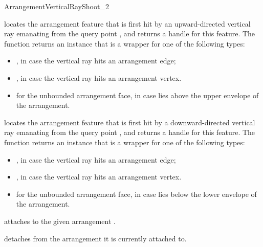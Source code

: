 \begin{ccRefConcept}{ArrangementVerticalRayShoot_2}
  {locates the arrangement feature that is first hit by an upward-directed
   vertical ray emanating from the query point ,
   and returns a handle for this feature.
   The function returns an  instance that is a wrapper for
   one of the following types:
   \begin{itemize}
   \item {}, in case the vertical
         ray hits an arrangement edge;
   \item {}, in case the vertical
         ray hits an arrangement vertex.
   \item {} for the unbounded arrangement
         face, in case  lies above the upper envelope of the
         arrangement.
   \end{itemize}
   }

  {locates the arrangement feature that is first hit by a downward-directed
   vertical ray emanating from the query point ,
   and returns a handle for this feature.
   The function returns an  instance that is a wrapper for
   one of the following types:
   \begin{itemize}
   \item {}, in case the vertical
         ray hits an arrangement edge;
   \item {}, in case the vertical
         ray hits an arrangement vertex.
   \item {} for the unbounded arrangement
         face, in case  lies below the lower envelope of the
         arrangement.
   \end{itemize}
   }

\ccOperations

  {attaches \ccVar{} to the given arrangement .}

  {detaches \ccVar{} from the arrangement it is currently attached to.}

\ccHasModels

\\
 \\
\\
\\

\end{ccRefConcept}

\ccRefPageEnd
